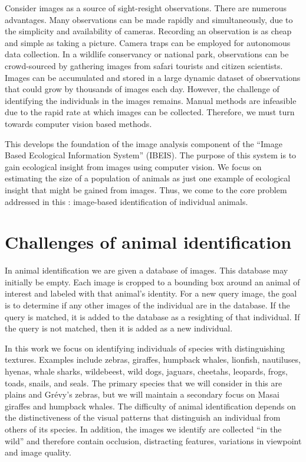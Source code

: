     Consider images as a source of sight-resight observations. There are numerous advantages. Many observations can
    be made rapidly and simultaneously, due to the simplicity and availability of cameras. Recording an observation
    is as cheap and simple as taking a picture. Camera traps can be employed for autonomous data collection. In a
    wildlife conservancy or national park, observations can be crowd-sourced by gathering images from safari
    tourists and citizen scientists. Images can be accumulated and stored in a large dynamic dataset of
    observations that could grow by thousands of images each day. However, the challenge of identifying the
    individuals in the images remains. Manual methods are infeasible due to the rapid rate at which images can be
    collected. Therefore, we must turn towards computer vision based methods.

    This \thesis{} develops the foundation of the image analysis component of the ``Image Based Ecological
      Information System'' (IBEIS).
    The purpose of this system is to gain ecological insight from images using computer vision.
    We focus on estimating the size of a population of animals as just one example of ecological insight that
      might be gained from images.
    Thus, we come to the core problem addressed in this \thesis{}:
    image-based identification of individual animals.

\section{Challenges of animal identification}\label{sec:challenges}

    In animal identification we are given a database of images.
    This database may initially be empty.
    Each image is cropped to a bounding box around an animal of interest and labeled with that animal's identity.
    For a new query image, the goal is to determine if any other images of the individual are in the database.
    If the query is matched, it is added to the database as a resighting of that individual.
    If the query is not matched, then it is added as a new individual.

    In this work we focus on identifying individuals of species with distinguishing textures. Examples include
    zebras, giraffes, humpback whales, lionfish, nautiluses, hyenas, whale sharks, wildebeest, wild dogs, jaguars,
    cheetahs, leopards, frogs, toads, snails, and seals. The primary species that we will consider in this
    \thesis{} are plains and Grévy's zebras, but we will maintain a secondary focus on Masai giraffes and humpback
    whales. The difficulty of animal identification depends on the distinctiveness of the visual patterns that
    distinguish an individual from others of its species. In addition, the images we identify are collected ``in
    the wild'' and therefore contain occlusion, distracting features, variations in viewpoint and image quality.

